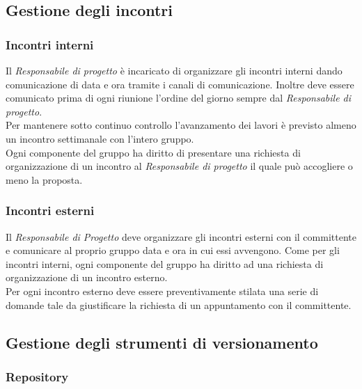 \documentclass[../NormediProgetto.tex]{subfiles}
\begin{document}
	\subsection{Gestione degli incontri}
	
	\subsubsection{Incontri interni}
	
	Il \textit{Responsabile di progetto} è incaricato di organizzare gli incontri interni dando comunicazione di data e ora tramite i canali di comunicazione. Inoltre deve essere comunicato prima di ogni riunione l'ordine del giorno sempre dal \textit{Responsabile di progetto}.
	\\ \noindent Per mantenere sotto continuo controllo l'avanzamento dei lavori è previsto almeno un incontro settimanale con l'intero gruppo.
	\\ \noindent Ogni componente del gruppo ha diritto di presentare una richiesta di organizzazione di un incontro al \textit{Responsabile di progetto} il quale può accogliere o meno la proposta.
	
	\subsubsection{Incontri esterni}
	
	Il \textit{Responsabile di Progetto} deve organizzare gli incontri esterni con il committente e comunicare al proprio gruppo data e ora in cui essi avvengono. Come per gli incontri interni, ogni componente del gruppo ha diritto ad una richiesta di organizzazione di un incontro esterno.
	\\ \noindent Per ogni incontro esterno deve essere preventivamente stilata una serie di domande tale da giustificare la richiesta di un appuntamento con il committente.
	
	\subsection{Gestione degli strumenti di versionamento}
	
	\subsubsection{Repository}
	
\end{document}
